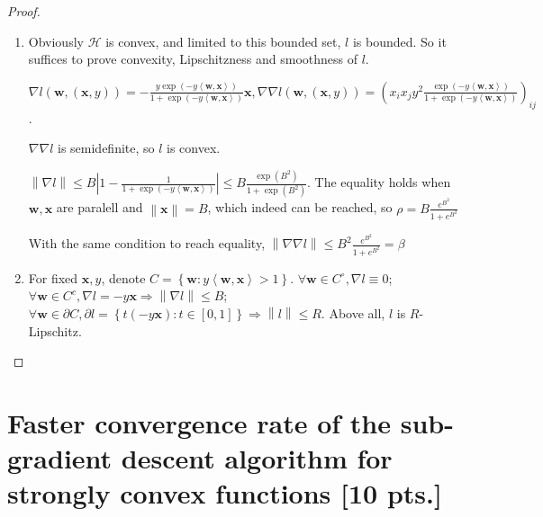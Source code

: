 \documentclass[12pt,letterpaper]{article}
\theoremstyle{definition}
\begin{document}
  \begin{proof}
\begin{enumerate}
\item Obviously $\mathcal{H}$ is convex, and limited to this bounded set, $l$ is bounded. So it suffices to prove convexity, Lipschitzness and smoothness of $l$.

  $\nabla l(\bm{w}, (\bm{x}, y))=-\frac{y \exp(-y \left\langle \bm{w}, \bm{x} \right\rangle)}{1+ \exp(-y \left\langle \bm{w},\bm{x} \right\rangle)}\bm{x},
  \nabla\nabla l(\bm{w},(\bm{x},y))=(x_ix_jy^2\frac{\exp(-y \left\langle \bm{w},\bm{x} \right\rangle)}{1+\exp(-y \left\langle \bm{w},\bm{x} \right\rangle)})_{ij}$.

  $\nabla\nabla l$ is semidefinite, so $l$ is convex.

  $\left\|\nabla l\right\|\leq B |1- \frac{1}{1+\exp(-y \left\langle \bm{w},\bm{x} \right\rangle)}|\leq B \frac{\exp(B^2)}{1+\exp(B^2)}$. The equality holds when $\bm{w},\bm{x}$ are paralell and $\left\|\bm{x}\right\|=B$, which indeed can be reached, so $\rho=B \frac{e^{B^2}}{1+e^{B^2}}$

  With the same condition to reach equality, $\left\|\nabla\nabla l\right\|\leq B^2 \frac{e^{B^{2}}}{1+e^{B^2}}= \beta$

\item For fixed $\bm{x},y$, denote $C= \left\{\bm{w}: y \left\langle \bm{w},\bm{x} \right\rangle >1 \right\}$. $\forall \bm{w}\in C^{\circ}, \nabla l \equiv 0$; $\forall \bm{w}\in C^c, \nabla l= -y \bm{x}\Rightarrow \left\|\nabla l\right\|\leq B$; $\forall \bm{w}\in \partial C, \partial l=\left\{ t(-y \bm{x}): t\in [0,1] \right\}\Rightarrow \left\|l\right\|\leq R$. Above all, $l$ is $R$-Lipschitz.
\end{enumerate}
    
  \end{proof}




\section{Faster convergence rate of the sub-gradient descent algorithm for strongly convex functions [10 pts.]} 
\vspace{-2ex}
\end{document}
